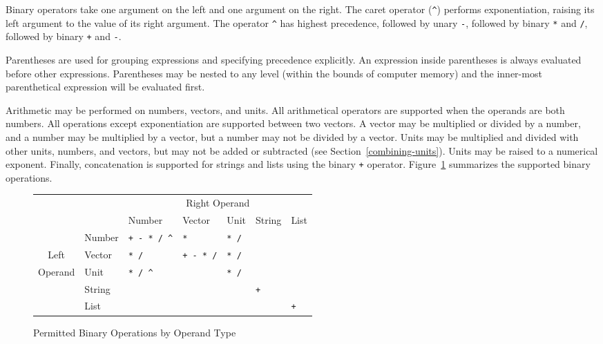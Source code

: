 Binary operators take one argument on the left and one argument on the
right. The caret operator (\verb|^|) performs exponentiation, raising
its left argument to the value of its right argument. The operator
\verb|^| has highest precedence, followed by unary \verb|-|, followed
by binary \verb|*| and \verb|/|, followed by binary \verb|+| and
\verb|-|.

Parentheses are used for grouping expressions and specifying
precedence explicitly.  An expression inside parentheses is always
evaluated before other expressions.  Parentheses may be nested to any
level (within the bounds of computer memory) and the inner-most
parenthetical expression will be evaluated first.

Arithmetic may be performed on numbers, vectors, and units.  All
arithmetical operators are supported when the operands are both
numbers.  All operations except exponentiation are supported between
two vectors.  A vector may be multiplied or divided by a number, and a
number may be multiplied by a vector, but a number may not be divided
by a vector.  Units may be multiplied and divided with other units,
numbers, and vectors, but may not be added or subtracted (see
Section~\ref{combining-units}).  Units may be raised to a numerical
exponent.  Finally, concatenation is supported for strings and lists
using the binary \verb|+| operator.  Figure~\ref{binops} summarizes
the supported binary operations.

\begin{figure}
\begin{tabular}{|cl|l|l|l|l|l|} \hline
        &         & \multicolumn{5}{c|}{Right Operand} \\
        &         & Number           & Vector           & Unit             & String           & List \\
\hline
        & Number  & \verb|+ - * / ^| & \verb|*|         & \verb|* /|       &                  &                  \\
Left    & Vector  & \verb|* /|       & \verb|+ - * /|   & \verb|* /|       &                  &                  \\
Operand & Unit    & \verb|* / ^|     &                  & \verb|* /|       &                  &                  \\
        & String  &                  &                  &                  & \verb|+|         &                  \\
        & List    &                  &                  &                  &                  & \verb|+|         \\
\hline
\end{tabular}
\caption{Permitted Binary Operations by Operand Type}
\label{binops}
\end{figure}

